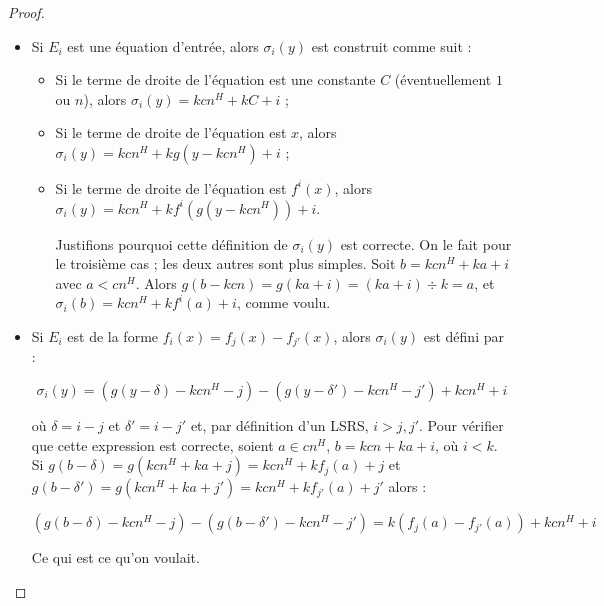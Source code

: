 \documentclass{article}
\begin{document}
\begin{proof}
\begin{enumerate}[itemsep=-1mm,leftmargin=2cm]
					\begin{itemize}[itemsep=-1mm, leftmargin=1cm]
						\item
							Si $E_i$ est une équation d'entrée, alors $\sigma_i(y)$ est construit comme suit :
					
							\begin{itemize}[itemsep=-1mm,leftmargin=1cm]
								\item %
								Si le terme de droite de l'équation est une constante $C$ (éventuellement $1$ ou $n$), alors $\sigma_i(y) = kcn^H + kC + i$ ;
								
								\item %
								Si le terme de droite de l'équation est $x$, alors $\sigma_i(y) = kcn^H + kg\left( y - kcn^H \right) + i$ ;
								
								\item %
								Si le terme de droite de l'équation est $f^i(x)$, alors $\sigma_i(y) = kcn^H + k f^i\left( g\left( y - kcn^H \right) \right) + i$.
								
								Justifions pourquoi cette définition de $\sigma_i(y)$ est correcte. On le fait pour le troisième cas ; les deux autres sont plus simples. Soit $b = kcn^H + ka + i$ avec $a < cn^H$. Alors $g(b-kcn) = g(ka + i) = (ka + i) \div k = a$, et $\sigma_i(b) = kcn^H + kf^i(a) + i$, comme voulu. 
							\end{itemize}
							
			
						\item
							Si $E_i$ est de la forme $f_i(x) = f_j(x) - f_{j'}(x)$, alors $\sigma_i(y)$ est défini par :
							
							\[
								\sigma_i(y) = \left( g(y - \delta) - k cn^H - j \right) - \left( g(y - \delta') - k cn^H - j' \right) + kcn^H + i
							\]
							
							où $\delta = i -j$ et $\delta' = i - j'$ et, par définition d'un LSRS, $i > j, j'$. Pour vérifier que cette expression est correcte, soient $a \in cn^H$, $b = kcn + ka + i$, où $i<k$. Si $g(b - \delta) = g(kcn^H + ka + j) = kcn^H + kf_j(a) + j$ et $g(b - \delta') = g(kcn^H + ka + j') = kcn^H + kf_{j'}(a) + j'$ alors :
							
							\[
								\left( g\left( b - \delta \right) - kcn^H - j \right) - \left( g\left( b - \delta' \right) - kcn^H - j' \right)
								=  k \left( f_{j}(a) - f_{j'}(a) \right) + kcn^H + i
							\]

							
							Ce qui est ce qu'on voulait.
							

\end{itemize}
\end{enumerate}
\end{proof}
\end{document}
